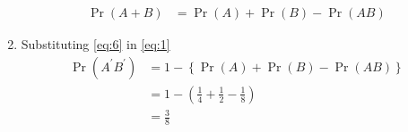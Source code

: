 \documentclass{article}
\providecommand{\cbrak}[1]{\ensuremath{\left\{#1\right\}}}
\providecommand{\brak}[1]{\ensuremath{\left(#1\right)}}
\providecommand{\pr}[1]{\ensuremath{\Pr\left(#1\right)}}
\begin{document}
\begin{enumerate}[label=13.\arabic{enumi}.\arabic{enumii}]
\begin{align}
\pr{A+B} &= \pr{A} + \pr{B} - \pr{AB} 
\label{eq:6}
\end{align}
\item Substituting \eqref{eq:6} in \eqref{eq:1}
\begin{align}
\pr{A^{\prime}B^{\prime}} &=  1 - \cbrak{\pr{A} + \pr{B} - \pr{AB} }
\\
&= 1 - \brak{\frac{1}{4} + \frac{1}{2} - \frac{1}{8}}
\\
&= \frac{3}{8}
\label{eq:7}
\end{align}

































\end{enumerate}
\end{document}
